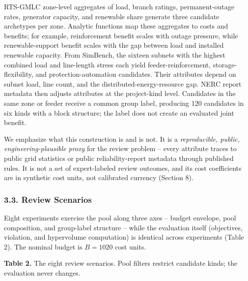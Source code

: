 \documentclass[
]{article}
\begin{document}
RTS-GMLC zone-level aggregates of load, branch ratings, permanent-outage rates, generator capacity, and renewable share generate three candidate archetypes per zone. Analytic functions map these aggregates to costs and benefits; for example, reinforcement benefit scales with outage pressure, while renewable-support benefit scales with the gap between load and installed renewable capacity. From SimBench, the sixteen subnets with the highest combined load and line-length stress each yield feeder-reinforcement, storage-flexibility, and protection-automation candidates. Their attributes depend on subnet load, line count, and the distributed-energy-resource gap. NERC report metadata then adjusts attributes at the project-kind level. Candidates in the same zone or feeder receive a common group label, producing 120 candidates in six kinds with a block structure; the label does not create an evaluated joint benefit.

We emphasize what this construction is and is not. It is a \emph{reproducible, public, engineering-plausible proxy} for the review problem -- every attribute traces to public grid statistics or public reliability-report metadata through published rules. It is not a set of expert-labeled review outcomes, and its cost coefficients are in synthetic cost units, not calibrated currency (Section 8).

\subsubsection{3.3. Review Scenarios}\label{review-scenarios}

Eight experiments exercise the pool along three axes -- budget envelope, pool composition, and group-label structure -- while the evaluation itself (objectives, violation, and hypervolume computation) is identical across experiments (Table 2). The nominal budget is \(B = 1020\) cost units.

\textbf{Table 2.} The eight review scenarios. Pool filters restrict candidate kinds; the evaluation never changes.
\end{document}
